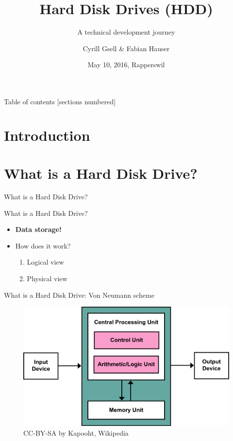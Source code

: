 \documentclass[12pt]{beamer}
\title{Hard Disk Drives (HDD)}
\subtitle{A technical development journey}
\date{May 10, 2016, Rapperswil}
\author{Cyrill Gsell \& Fabian Hauser}
\institute{Computer Science \\
	TecBEC Presentation FS 2016}
\newlength{\wideitemsep}
\let\olditem\item
\renewcommand{\item}{\setlength{\itemsep}{\wideitemsep}\olditem}
\begin{document}
\maketitle

\begin{frame}{Table of contents}
  [sections numbered]
  \tableofcontents
\end{frame}

\section{Introduction}
\section{What is a Hard Disk Drive?}
\begin{frame}[standout]
	What is a Hard Disk Drive?
\end{frame}
\begin{frame}[fragile]{What is a Hard Disk Drive?}
	\begin{itemize}
		\item \textbf{Data storage!}
		\item How does it work?
			\begin{enumerate}
				\item Logical view
				\item Physical view
			\end{enumerate}
	\end{itemize}
\end{frame}

\begin{frame}[fragile]{What is a Hard Disk Drive: Von Neumann scheme}
	\begin{figure}[p]
		\centering
		\includegraphics[width=\linewidth]{img/vonneumann.png}
		\caption{CC-BY-SA by Kapooht, Wikipedia}
	\end{figure}
\end{frame}
\end{document}
